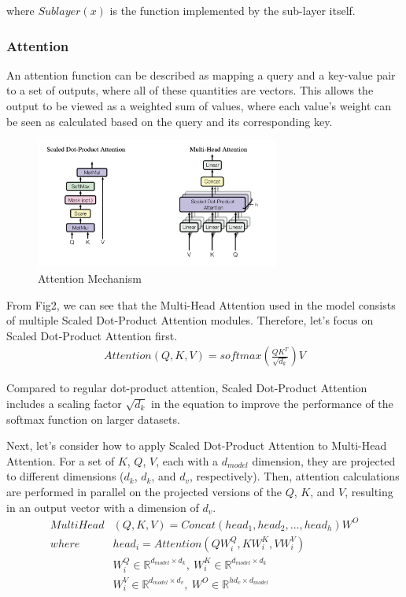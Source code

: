 \documentclass[conference]{IEEEtran}
\begin{document}
where $Sublayer(x)$ is the function implemented by the sub-layer itself.


\subsubsection{Attention}
\par An attention function can be described as mapping a query and a key-value pair 
to a set of outputs, where all of these quantities are vectors. This allows the output 
to be viewed as a weighted sum of values, where each value's weight can be seen as 
calculated based on the query and its corresponding key.

\begin{figure}[htbp]
    \centerline{\includegraphics[width = 8cm]{pic/fig2.png}}
    \caption{Attention Mechanism}
    \label{fig}
\end{figure}

\par From Fig2, we can see that the Multi-Head Attention used in the model consists of 
multiple Scaled Dot-Product Attention modules. Therefore, let's focus on 
Scaled Dot-Product Attention first.
\begin{align*}
    Attention(Q, K, V) = softmax(\frac{QK^T}{\sqrt{d_k}})V
\end{align*}

\par Compared to regular dot-product attention, Scaled Dot-Product Attention includes a 
scaling factor $\sqrt{d_k}$ in the equation to improve the performance of the softmax 
function on larger datasets.

\par Next, let's consider how to apply Scaled Dot-Product Attention to Multi-Head Attention. 
For a set of $K$, $Q$, $V$, each with a $d_{model}$ dimension, they are projected to different 
dimensions ($d_k$, $d_k$, and $d_v$, respectively). Then, attention calculations are 
performed in parallel on the projected versions of the $Q$, $K$, and $V$, 
resulting in an output vector with a dimension of $d_v$.
\begin{align*}
    MultiHead&(Q, K, V) = Concat(head_1, head_2, ... , head_h)W^O \\
    where \  &head_i = Attention(QW^Q_i, KW^K_i, VW^V_i)\\
    &W^Q_i \in \mathbb{R}^{d_{model}\times d_k}, \  
    W^K_i \in \mathbb{R}^{d_{model}\times d_k}\\
    &W^V_i \in \mathbb{R}^{d_{model}\times d_v}, \ 
    W^O \in \mathbb{R}^{hd_v \times d_{model}}
\end{align*}
\end{document}
